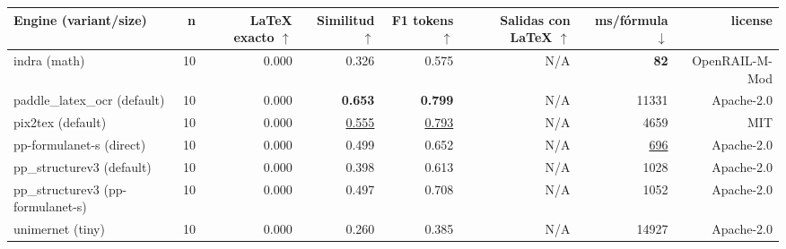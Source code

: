 \documentclass[border=2pt]{standalone}
\begin{document}
\begin{tabular}{lrrrrrrr}
\toprule
Engine (variant/size) & n & LaTeX exacto $\uparrow$ & Similitud $\uparrow$ & F1 tokens $\uparrow$ & Salidas con LaTeX $\uparrow$ & ms/fórmula $\downarrow$ & license \\
\midrule
indra (math) & 10 & 0.000 & 0.326 & 0.575 & N/A & \textbf{82} & OpenRAIL-M-Mod \\
paddle\_latex\_ocr (default) & 10 & 0.000 & \textbf{0.653} & \textbf{0.799} & N/A & 11331 & Apache-2.0 \\
pix2tex (default) & 10 & 0.000 & \underline{0.555} & \underline{0.793} & N/A & 4659 & MIT \\
pp-formulanet-s (direct) & 10 & 0.000 & 0.499 & 0.652 & N/A & \underline{696} & Apache-2.0 \\
pp\_structurev3 (default) & 10 & 0.000 & 0.398 & 0.613 & N/A & 1028 & Apache-2.0 \\
pp\_structurev3 (pp-formulanet-s) & 10 & 0.000 & 0.497 & 0.708 & N/A & 1052 & Apache-2.0 \\
unimernet (tiny) & 10 & 0.000 & 0.260 & 0.385 & N/A & 14927 & Apache-2.0 \\
\bottomrule
\end{tabular}
\par{}
\end{document}
